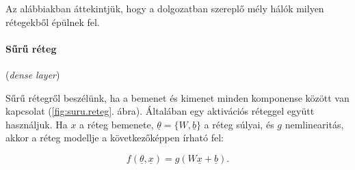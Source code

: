 Az alábbiakban áttekintjük, hogy a dolgozatban szereplő mély hálók milyen rétegekből épülnek fel.


\paragraph{Sűrű réteg} (\textit{dense layer}) 


Sűrű rétegről beszélünk, ha a bemenet és kimenet minden komponense között van kapcsolat (\ref{fig:suru.reteg}. ábra). Általában egy aktivációs réteggel együtt használjuk. Ha $ x $ a réteg bemenete, $ \underline{\theta} = \{W, \underline{b}\} $ a réteg súlyai, és $ g $ nemlinearitás, akkor a réteg modellje a következőképpen írható fel:


\[  
f(\underline{\theta}, \underline{x}) = g(W \underline{x} + \underline{b}) .
\]


